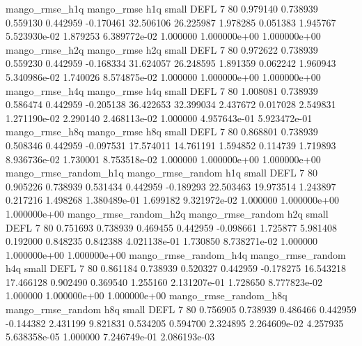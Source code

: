        mango_rmse_h1q        mango_rmse                  h1q      small     DEFL                 7 80 0.979140       0.738939 0.559130       0.442959   -0.170461     32.506106     26.225987     1.978285       0.051383  1.945767 5.523930e-02     1.879253   6.389772e-02            1.000000    1.000000e+00        1.000000e+00
       mango_rmse_h2q        mango_rmse                  h2q      small     DEFL                 7 80 0.972622       0.738939 0.559230       0.442959   -0.168334     31.624057     26.248595     1.891359       0.062242  1.960943 5.340986e-02     1.740026   8.574875e-02            1.000000    1.000000e+00        1.000000e+00
       mango_rmse_h4q        mango_rmse                  h4q      small     DEFL                 7 80 1.008081       0.738939 0.586474       0.442959   -0.205138     36.422653     32.399034     2.437672       0.017028  2.549831 1.271190e-02     2.290140   2.468113e-02            1.000000    4.957643e-01        5.923472e-01
       mango_rmse_h8q        mango_rmse                  h8q      small     DEFL                 7 80 0.868801       0.738939 0.508346       0.442959   -0.097531     17.574011     14.761191     1.594852       0.114739  1.719893 8.936736e-02     1.730001   8.753518e-02            1.000000    1.000000e+00        1.000000e+00
mango_rmse_random_h1q mango_rmse_random                  h1q      small     DEFL                 7 80 0.905226       0.738939 0.531434       0.442959   -0.189293     22.503463     19.973514     1.243897       0.217216  1.498268 1.380489e-01     1.699182   9.321972e-02            1.000000    1.000000e+00        1.000000e+00
mango_rmse_random_h2q mango_rmse_random                  h2q      small     DEFL                 7 80 0.751693       0.738939 0.469455       0.442959   -0.098661      1.725877      5.981408     0.192000       0.848235  0.842388 4.021138e-01     1.730850   8.738271e-02            1.000000    1.000000e+00        1.000000e+00
mango_rmse_random_h4q mango_rmse_random                  h4q      small     DEFL                 7 80 0.861184       0.738939 0.520327       0.442959   -0.178275     16.543218     17.466128     0.902490       0.369540  1.255160 2.131207e-01     1.728650   8.777823e-02            1.000000    1.000000e+00        1.000000e+00
mango_rmse_random_h8q mango_rmse_random                  h8q      small     DEFL                 7 80 0.756905       0.738939 0.486466       0.442959   -0.144382      2.431199      9.821831     0.534205       0.594700  2.324895 2.264609e-02     4.257935   5.638358e-05            1.000000    7.246749e-01        2.086193e-03

